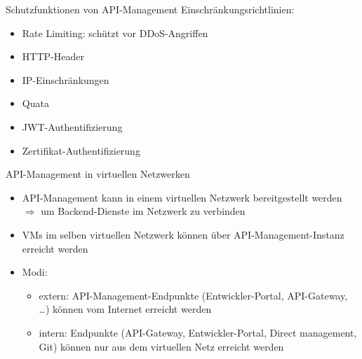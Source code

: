 \begin{flashcard}[]{Schutzfunktionen von API-Management}
  Einschränkungsrichtlinien:
  \begin{itemize}
    \item Rate Limiting: schützt vor DDoS-Angriffen
    \item HTTP-Header
    \item IP-Einschränkungen
    \item Quata
    \item JWT-Authentifizierung
    \item Zertifikat-Authentifizierung
  \end{itemize}
\end{flashcard}

\begin{flashcard}[]{API-Management in virtuellen Netzwerken}
  \begin{itemize}
    \item API-Management kann in einem virtuellen Netzwerk bereitgestellt werden\newline
      $\Rightarrow$ um Backend-Dienste im Netzwerk zu verbinden
    \item VMs im selben virtuellen Netzwerk können über API-Management-Instanz erreicht werden
    \item Modi:
      \begin{itemize}
        \item extern: API-Management-Endpunkte (Entwickler-Portal, API-Gateway, \ldots) können vom Internet erreicht werden
        \item intern: Endpunkte (API-Gateway, Entwickler-Portal, Direct management, Git) können nur aus dem virtuellen Netz erreicht werden
      \end{itemize}
  \end{itemize}
\end{flashcard}

